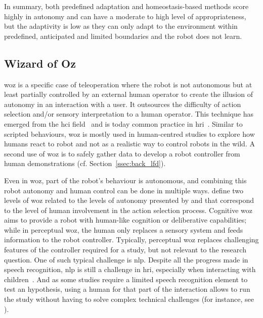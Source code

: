 	
	In summary, both predefined adaptation and homeostasis-based methods score highly in autonomy and can have a moderate to high level of appropriateness, but the adaptivity is low as they can only adapt to the environment within predefined, anticipated and limited boundaries and the robot does not learn.

\subsection{Wizard of Oz} \label{subsec:WoZ}

	\acrfull{woz} is a specific case of teleoperation where the robot is not autonomous but at least partially controlled by an external human operator to create the illusion of autonomy in an interaction with a user. It outsources the difficulty of action selection and/or sensory interpretation to a human operator. This technique has emerged from the \gls{hci} field~\citep{kelley1983empirical} and is today common practice in \gls{hri}~\citep{riek2012wizard}. Similar to scripted behaviours, \gls{woz} is mostly used in human-centred studies to explore how humans react to robot and not as a realistic way to control robots in the wild. A second use of \gls{woz} is to safely gather data to develop a robot controller from human demonstrations (cf. Section~\ref{ssec:back_lfd}).
	
	Even in \gls{woz}, part of the robot's behaviour is autonomous, and combining this robot autonomy and human control can be done in multiple ways. \cite{baxter2016characterising} define two levels of \gls{woz} related to the levels of autonomy presented by \cite{beer2014toward} and that correspond to the level of human involvement in the action selection process. Cognitive \gls{woz} aims to provide a robot with human-like cognition or deliberative capabilities; while in perceptual \gls{woz}, the human only replaces a sensory system and feeds information to the robot controller. Typically, perceptual \gls{woz} replaces challenging features of the controller required for a study, but not relevant to the research question. One of such typical challenge is \gls{nlp}. Despite all the progress made in speech recognition, \gls{nlp} is still a challenge in \gls{hri}, especially when interacting with children~\citep{kennedy2017child}. And as some studies require a limited speech recognition element to test an hypothesis, using a human for that part of the interaction allows to run the study without having to solve complex technical challenges (for instance, see \citealt{cakmak2010designing}).

